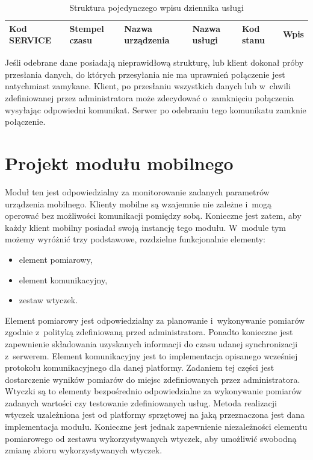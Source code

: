 \begin{table}[H]
\centering
\caption{Struktura pojedynczego wpisu dziennika usługi }
\begin{tabular}{|p{2cm}|p{2cm}|p{3cm}|p{2cm}|p{1cm}|p{2cm}|}
  \hline
  \raggedright{Kod SERVICE} & \raggedright{Stempel czasu} & \raggedright{Nazwa urządzenia} & \raggedright{Nazwa usługi} & \raggedright{Kod stanu} & Wpis  \\
  \hline
\end{tabular}
\end{table}

Jeśli odebrane dane posiadają nieprawidłową strukturę, lub klient
dokonał próby przesłania danych, do których przesyłania nie ma
uprawnień połączenie jest natychmiast zamykane. Klient, po przesłaniu
wszystkich danych lub w~chwili zdefiniowanej przez administratora może
zdecydować o~zamknięciu połączenia wysyłając odpowiedni
komunikat. Serwer po odebraniu tego komunikatu zamknie połączenie.


\section[Projekt modułu mobilnego][Projekt modułu mobilnego]{Projekt modułu mobilnego}

Moduł ten jest odpowiedzialny za monitorowanie zadanych parametrów
urządzenia mobilnego. Klienty mobilne są wzajemnie nie zależne i~mogą
operować bez możliwości komunikacji pomiędzy sobą. Konieczne jest
zatem, aby każdy klient mobilny posiadał swoją instancję tego
modułu. W~module tym możemy wyróżnić trzy podstawowe, rozdzielne
funkcjonalnie elementy:

\begin{itemize}
\item element pomiarowy,
\item element komunikacyjny,
\item zestaw wtyczek.
\end{itemize}

Element pomiarowy jest odpowiedzialny za planowanie i~wykonywanie
pomiarów zgodnie z~polityką zdefiniowaną przed administratora. Ponadto
konieczne jest zapewnienie składowania uzyskanych informacji do czasu
udanej synchronizacji z~serwerem. Element komunikacyjny jest to
implementacja opisanego wcześniej protokołu komunikacyjnego dla danej
platformy. Zadaniem tej części jest dostarczenie wyników pomiarów do
miejsc zdefiniowanych przez administratora. Wtyczki są to elementy
bezpośrednio odpowiedzialne za wykonywanie pomiarów zadanych wartości
czy testowanie zdefiniowanych usług. Metoda realizacji wtyczek
uzależniona jest od platformy sprzętowej na jaką przeznaczona jest
dana implementacja modułu. Konieczne jest jednak zapewnienie
niezależności elementu pomiarowego od zestawu wykorzystywanych
wtyczek, aby umożliwić swobodną zmianę zbioru wykorzystywanych
wtyczek.

